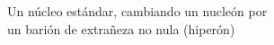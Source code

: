 \documentclass[preview]{standalone}
\begin{document}
\begin{center}
Un núcleo estándar, cambiando un nucleón por \\un barión de extrañeza no nula (hiperón)
\end{center}
\end{document}
